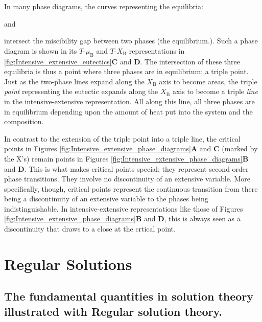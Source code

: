 \documentclass[12pt]{article}
\begin{document}
In many phase diagrams, the curves representing the equilibria: 
\begin{center}
 and 
\end{center}
intersect the miscibility gap between two phases (the  equilibrium.). Such a phase diagram is shown in its \(T\)-\(\mu_{\text{B}}\) and \(T\)-\(X_{\text{B}}\) representations in \ref{fig:Intensive_extensive_eutectics}\textbf{C} and \textbf{D}. The intersection of these three equilibria is thus a point where three phases are in equilibrium; a triple point. Just as the two-phase lines expand along the $X_\text{B}$ axis to become areas, the triple \emph{point} representing the eutectic expands along the $X_\text{B}$ axis to become a triple \emph{line} in the intensive-extensive representation. All along this line, all three phases are in equilibrium depending upon the amount of heat put into the system and the composition.

In contrast to the extension of the triple point into a triple line, the critical points in Figures \ref{fig:Intensive_extensive_phase_diagrams}\textbf{A} and \textbf{C} (marked by the X's) remain points in Figures \ref{fig:Intensive_extensive_phase_diagrams}\textbf{B} and \textbf{D}. This is what makes critical points special; they represent second order phase transitions. They involve no discontinuity of an extensive variable. More specifically, though, critical points represent the continuous transition from there being a discontinuity of an extensive variable to the phases being indistinguishable. In intensive-extensive representations like those of Figures \ref{fig:Intensive_extensive_phase_diagrams}\textbf{B} and \textbf{D}, this is always seen as a discontinuity that draws to a close at the crtical point.

\section{Regular Solutions}

\subsection{The fundamental quantities in solution theory illustrated with Regular solution theory.}
\end{document}
